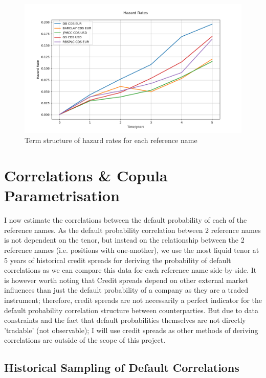 \documentclass{report}
\theoremstyle{plain}
\theoremstyle{definition}
\begin{document}
\begin{figure}[H]
	\begin{center}
		\includegraphics[width=15cm]{Hazard_Rates.png}
		\caption{Term structure of hazard rates for each reference name} 
		\label{Hazard_Rates}
	\end{center}
\end{figure}


\chapter{Correlations \& Copula Parametrisation}

I now estimate the correlations between the default probability of each of the reference names. As the default probability correlation between 2 reference names is not dependent on the tenor, but instead on the relationship between the 2 reference names (i.e. positions with one-another), we use the most liquid tenor at 5 years of historical credit spreads for deriving the probability of default correlations as we can compare this data for each reference name side-by-side. It is however worth noting that Credit spreads depend on other external market influences than just the default probability of a company as they are a traded instrument; therefore, credit spreads are not necessarily a perfect indicator for the default probability correlation structure between counterparties. But due to data constraints and the fact that default probabilities themselves are not directly 'tradable' (not observable); I will use credit spreads as other methods of deriving correlations are outside of the scope of this project.\\

\section{Historical Sampling of Default Correlations}
\end{document}
